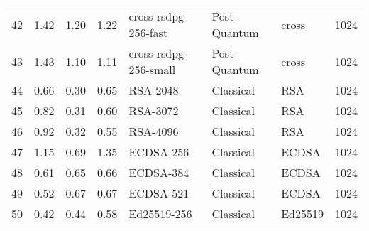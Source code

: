 \begin{table}
\begin{tabular}{lrrrlllr}
42 & 1.42 & 1.20 & 1.22 & cross-rsdpg-256-fast & Post-Quantum & cross & 1024 \\
43 & 1.43 & 1.10 & 1.11 & cross-rsdpg-256-small & Post-Quantum & cross & 1024 \\
44 & 0.66 & 0.30 & 0.65 & RSA-2048 & Classical & RSA & 1024 \\
45 & 0.82 & 0.31 & 0.60 & RSA-3072 & Classical & RSA & 1024 \\
46 & 0.92 & 0.32 & 0.55 & RSA-4096 & Classical & RSA & 1024 \\
47 & 1.15 & 0.69 & 1.35 & ECDSA-256 & Classical & ECDSA & 1024 \\
48 & 0.61 & 0.65 & 0.66 & ECDSA-384 & Classical & ECDSA & 1024 \\
49 & 0.52 & 0.67 & 0.67 & ECDSA-521 & Classical & ECDSA & 1024 \\
50 & 0.42 & 0.44 & 0.58 & Ed25519-256 & Classical & Ed25519 & 1024 \\
\bottomrule
\end{tabular}
\end{table}
